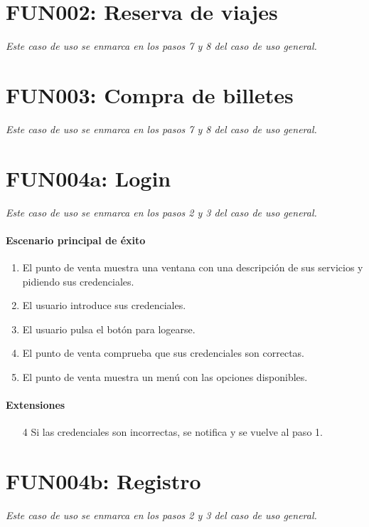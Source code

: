 \section{FUN002: Reserva de viajes}
  \emph{Este caso de uso se enmarca en los pasos 7 y 8 del caso de uso general.}

\section{FUN003: Compra de billetes}
  \emph{Este caso de uso se enmarca en los pasos 7 y 8 del caso de uso general.}

\section{FUN004a: Login}
  \emph{Este caso de uso se enmarca en los pasos 2 y 3 del caso de uso general.}
  \paragraph{Escenario principal de éxito}
  \begin{enumerate}
    \item El punto de venta muestra una ventana con una descripción de sus servicios y pidiendo sus credenciales.
    \item El usuario introduce sus credenciales.
    \item El usuario pulsa el botón para logearse.
    \item El punto de venta comprueba que sus credenciales son correctas.
    \item El punto de venta muestra un menú con las opciones disponibles.
  \end{enumerate}
  \paragraph{Extensiones}
  \begin{enumerate}
    \item[4] Si las credenciales son incorrectas, se notifica y se vuelve al paso 1.
  \end{enumerate}

\section{FUN004b: Registro}
  \emph{Este caso de uso se enmarca en los pasos 2 y 3 del caso de uso general.}

